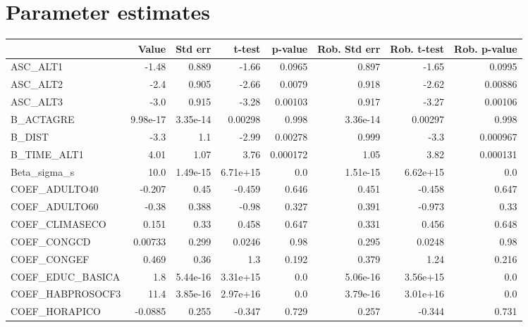 \section{Parameter estimates}
\begin{tabular}{lrrrrrrr}
\toprule
{} &    Value &  Std err &   t-test &  p-value &  Rob. Std err &  Rob. t-test &  Rob. p-value \\
\midrule
ASC\_ALT1         &    -1.48 &    0.889 &    -1.66 &   0.0965 &         0.897 &        -1.65 &        0.0995 \\
ASC\_ALT2         &     -2.4 &    0.905 &    -2.66 &   0.0079 &         0.918 &        -2.62 &       0.00886 \\
ASC\_ALT3         &     -3.0 &    0.915 &    -3.28 &  0.00103 &         0.917 &        -3.27 &       0.00106 \\
B\_ACTAGRE        & 9.98e-17 & 3.35e-14 &  0.00298 &    0.998 &      3.36e-14 &      0.00297 &         0.998 \\
B\_DIST           &     -3.3 &      1.1 &    -2.99 &  0.00278 &         0.999 &         -3.3 &      0.000967 \\
B\_TIME\_ALT1      &     4.01 &     1.07 &     3.76 & 0.000172 &          1.05 &         3.82 &      0.000131 \\
Beta\_sigma\_s     &     10.0 & 1.49e-15 & 6.71e+15 &      0.0 &      1.51e-15 &     6.62e+15 &           0.0 \\
COEF\_ADULTO40    &   -0.207 &     0.45 &   -0.459 &    0.646 &         0.451 &       -0.458 &         0.647 \\
COEF\_ADULTO60    &    -0.38 &    0.388 &    -0.98 &    0.327 &         0.391 &       -0.973 &          0.33 \\
COEF\_CLIMASECO   &    0.151 &     0.33 &    0.458 &    0.647 &         0.331 &        0.456 &         0.648 \\
COEF\_CONGCD      &  0.00733 &    0.299 &   0.0246 &     0.98 &         0.295 &       0.0248 &          0.98 \\
COEF\_CONGEF      &    0.469 &     0.36 &      1.3 &    0.192 &         0.379 &         1.24 &         0.216 \\
COEF\_EDUC\_BASICA &      1.8 & 5.44e-16 & 3.31e+15 &      0.0 &      5.06e-16 &     3.56e+15 &           0.0 \\
COEF\_HABPROSOCF3 &     11.4 & 3.85e-16 & 2.97e+16 &      0.0 &      3.79e-16 &     3.01e+16 &           0.0 \\
COEF\_HORAPICO    &  -0.0885 &    0.255 &   -0.347 &    0.729 &         0.257 &       -0.344 &         0.731 \\

\end{tabular}
